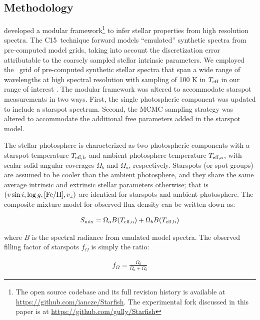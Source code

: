 \documentclass[twocolumn]{emulateapj}%
\newcommand{\iancze}{{\sc C15}}
\begin{document}
\subsection{Methodology}\label{sec:methods} 

\citet[hereafter \iancze]{czekala15} developed a modular framework\footnote{The open source codebase and its full revision history is available at \url{https://github.com/iancze/Starfish}.  The experimental fork discussed in this paper is at \url{https://github.com/gully/Starfish}} to infer stellar properties from high resolution spectra.  The \iancze\ technique forward models ``emulated'' synthetic spectra from pre-computed model grids, taking into account the discretization error attributable to the coarsely sampled stellar intrinsic parameters.  We employed the \PHOENIX\ grid of pre-computed synthetic stellar spectra that span a wide range of wavelengths at high spectral resolution with sampling of 100 K in $T_\textrm{eff}$ in our range of interest \citep{husser13}.  The modular framework was altered to accommodate starspot measurements in two ways. First, the single photospheric component was updated to include a starspot spectrum. Second, the MCMC sampling strategy was altered to accommodate the additional free parameters added in the starspot model.

The stellar photosphere is characterized as two photospheric components with a starspot temperature $T_\textrm{eff,b}$ and ambient photosphere temperature $T_\textrm{eff,a}$, with scalar solid angular coverages $\Omega_b$ and $\Omega_a$, respectively.    Starspots (or spot groups) are assumed to be cooler than the ambient photosphere, and they share the same average intrinsic and extrinsic stellar parameters otherwise; that is $(v \sin i, \log g, [{\rm Fe}/{\rm H}], v_z)$ are identical for starspots and ambient photosphere.  The composite mixture model for observed flux density can be written down as:

\begin{eqnarray} \label{eqn:mix_M}
S_{\mathrm{mix}} = \Omega_a B(T_\textrm{eff,a})  + \Omega_b B(T_\textrm{eff,b})
\end{eqnarray}

where $B$ is the spectral radiance from emulated model spectra.  The observed filling factor of starspots $f_{\Omega}$ is simply the ratio:

\begin{eqnarray} \label{eqn:fill_factor}
f_{\Omega} = \frac{\Omega_b}{\Omega_a + \Omega_b}
\end{eqnarray}
\end{document}
